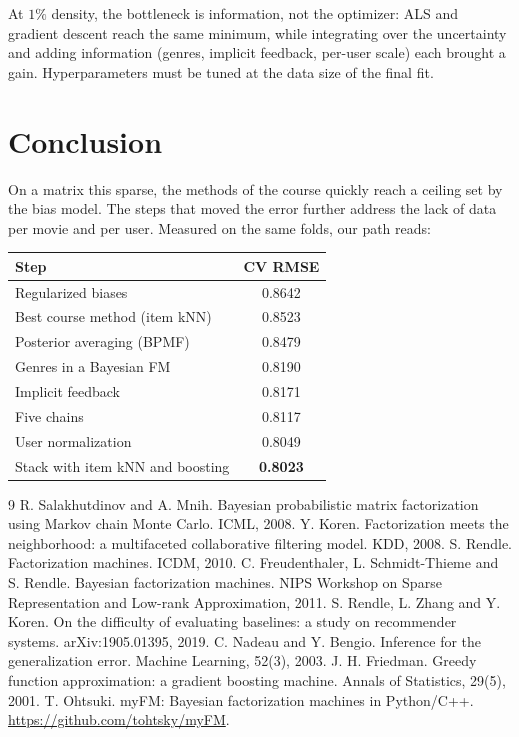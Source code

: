 \documentclass[10pt,a4paper,twocolumn]{article}
\begin{document}
At $1\%$ density, the bottleneck is information, not the optimizer: ALS and gradient descent reach the same
minimum, while integrating over the uncertainty and adding information (genres, implicit feedback, per-user
scale) each brought a gain. Hyperparameters must be tuned at the data size of the final fit.

\section{Conclusion}

On a matrix this sparse, the methods of the course quickly reach a ceiling set by the bias model. The steps
that moved the error further address the lack of data per movie and per user. Measured on the same folds,
our path reads:
\begin{center}\small
\begin{tabular}{@{}lc@{}}
\toprule
Step & CV RMSE \\
\midrule
Regularized biases                    & 0.8642 \\
Best course method (item kNN)         & 0.8523 \\
Posterior averaging (BPMF)            & 0.8479 \\
Genres in a Bayesian FM               & 0.8190 \\
Implicit feedback                     & 0.8171 \\
Five chains                           & 0.8117 \\
User normalization                    & 0.8049 \\
Stack with item kNN and boosting      & \textbf{0.8023} \\
\bottomrule
\end{tabular}
\end{center}

{\small
\begin{thebibliography}{9}
\setlength{\itemsep}{1pt}
\setlength{\parsep}{0pt}
 R. Salakhutdinov and A. Mnih. Bayesian probabilistic matrix factorization using Markov chain
Monte Carlo. ICML, 2008.
 Y. Koren. Factorization meets the neighborhood: a multifaceted collaborative filtering model.
KDD, 2008.
 S. Rendle. Factorization machines. ICDM, 2010.
 C. Freudenthaler, L. Schmidt-Thieme and S. Rendle. Bayesian factorization machines. NIPS Workshop
on Sparse Representation and Low-rank Approximation, 2011.
 S. Rendle, L. Zhang and Y. Koren. On the difficulty of evaluating baselines: a study on
recommender systems. arXiv:1905.01395, 2019.
 C. Nadeau and Y. Bengio. Inference for the generalization error. Machine Learning, 52(3), 2003.
 J. H. Friedman. Greedy function approximation: a gradient boosting machine. Annals of
Statistics, 29(5), 2001.
 T. Ohtsuki. myFM: Bayesian factorization machines in Python/C++.
\url{https://github.com/tohtsky/myFM}.
\end{thebibliography}
}
\end{document}
